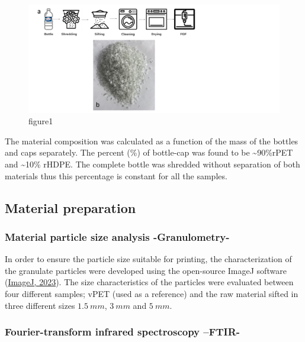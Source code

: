 \documentclass[
  12pt,
  number,
  review]{elsarticle}
\begin{document}
\begin{figure}

{\centering \includegraphics{figures/Figure-1.png}

}

\caption{figure1}

\end{figure}

The material composition was calculated as a function of the mass of the
bottles and caps separately. The percent (\%) of bottle-cap was found to
be \textasciitilde90\%rPET and \textasciitilde10\% rHDPE. The complete
bottle was shredded without separation of both materials thus this
percentage is constant for all the samples.

\hypertarget{material-preparation}{%
\subsection{Material preparation}\label{material-preparation}}

\hypertarget{material-particle-size-analysis--granulometry-}{%
\subsubsection{Material particle size analysis
-Granulometry-}\label{material-particle-size-analysis--granulometry-}}

In order to ensure the particle size suitable for printing, the
characterization of the granulate particles were developed using the
open-source ImageJ software (\protect\hyperlink{ref-imagej2023}{ImageJ,
2023}). The size characteristics of the particles were evaluated between
four different samples; vPET (used as a reference) and the raw material
sifted in three different sizes \(1.5~mm\), \(3~mm\) and \(5~mm\).

\hypertarget{fourier-transform-infrared-spectroscopy-ftir-}{%
\subsubsection{Fourier-transform infrared spectroscopy
--FTIR-}\label{fourier-transform-infrared-spectroscopy-ftir-}}
\end{document}
